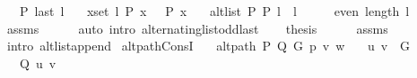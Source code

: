 \begin{isabellebody}
\ \ \ {\isachardoublequoteopen}P{}\ {\isacharparenleft}{\kern0pt}last\ l{}{\isacharparenright}{\kern0pt}{\isachardoublequoteclose}\isanewline
\ \ \ {\isachardoublequoteopen}{\isasymforall}x{\isasymin}set\ l{}{\isachardot}{\kern0pt}\ P{}\ x\ {\isasymlongleftrightarrow}\ {\isasymnot}\ P{}\ x{\isachardoublequoteclose}\isanewline
\ \ \ {\isachardoublequoteopen}alt{\isacharunderscore}{\kern0pt}list\ P{}\ P{}\ {\isacharparenleft}{\kern0pt}l{}\ {\isacharat}{\kern0pt}\ l{}{\isacharparenright}{\kern0pt}{\isachardoublequoteclose}%
\endisataginvisible
{\isafoldinvisible}%
%
\isadeliminvisible
%
\endisadeliminvisible
\isanewline
%
\isadelimproof
%
\endisadelimproof
%
\isatagproof
{}\isamarkupfalse%
\ {\isacharminus}{\kern0pt}\isanewline
\ \ \isamarkupfalse%
\ {\isachardoublequoteopen}even\ {\isacharparenleft}{\kern0pt}length\ l{}{\isacharparenright}{\kern0pt}{\isachardoublequoteclose}\isanewline
\ \ \ \ \isamarkupfalse%
\ assms\isanewline
\ \ \ \ \isamarkupfalse%
\ {\isacharparenleft}{\kern0pt}auto\ intro{\isacharcolon}{\kern0pt}\ alternating{\isacharunderscore}{\kern0pt}list{\isacharunderscore}{\kern0pt}odd{\isacharunderscore}{\kern0pt}last{\isacharparenright}{\kern0pt}\isanewline
\ \ \isamarkupfalse%
\ {\isacharquery}{\kern0pt}thesis\isanewline
\ \ \ \ \isamarkupfalse%
\ assms{\isacharparenleft}{\kern0pt}{}{\isacharcomma}{\kern0pt}\ {}{\isacharparenright}{\kern0pt}\isanewline
\ \ \ \ \isamarkupfalse%
\ {\isacharparenleft}{\kern0pt}intro\ alt{\isacharunderscore}{\kern0pt}list{\isacharunderscore}{\kern0pt}append{\isacharunderscore}{\kern0pt}{}{\isacharparenright}{\kern0pt}\isanewline
{}\isamarkupfalse%
%
\endisatagproof
{\isafoldproof}%
%
\isadelimproof
%
\endisadelimproof
\isanewline
\isanewline
{}\isamarkupfalse%
\ alt{\isacharunderscore}{\kern0pt}path{\isacharunderscore}{\kern0pt}ConsI{\isacharcolon}{\kern0pt}\isanewline
\ \ \ {\isachardoublequoteopen}alt{\isacharunderscore}{\kern0pt}path\ P\ Q\ G\ p\ v\ w{\isachardoublequoteclose}\isanewline
\ \ \ {\isachardoublequoteopen}{\isacharbraceleft}{\kern0pt}u{\isacharcomma}{\kern0pt}\ v{\isacharbraceright}{\kern0pt}\ {\isasymin}\ G{\isachardoublequoteclose}\isanewline
\ \ \ {\isachardoublequoteopen}Q\ {\isacharbraceleft}{\kern0pt}u{\isacharcomma}{\kern0pt}\ v{\isacharbraceright}{\kern0pt}{\isachardoublequoteclose}\isanewline

\end{isabellebody}
